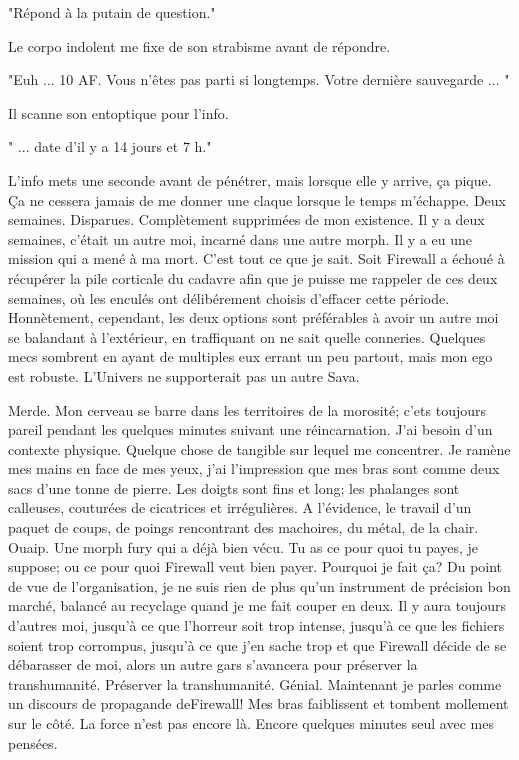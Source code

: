 "Répond à la putain de question." 

Le corpo indolent me fixe de son strabisme avant de répondre. 

"Euh ... 10 AF. Vous n'êtes pas parti si longtemps. Votre dernière sauvegarde ... " 

Il scanne son entoptique pour l'info. 

" ... date d'il y a 14 jours et 7 h." 

L'info mets une seconde avant de pénétrer, mais lorsque elle y arrive, ça pique. Ça ne cessera jamais de me donner une claque lorsque le temps m'échappe. Deux semaines. Disparues. Complètement supprimées de mon existence. Il y a deux semaines, c'était un autre moi, incarné dans une autre morph. Il y a eu une mission qui a mené à ma mort. C'est tout ce que je sait. Soit Firewall a échoué à récupérer la pile corticale du cadavre afin que je puisse me rappeler de ces deux semaines, où les enculés ont délibérement choisis d'effacer cette période. Honnètement, cependant, les deux options sont préférables à avoir un autre moi se balandant à l'extérieur, en traffiquant on ne sait quelle conneries. Quelques mecs sombrent en ayant de multiples eux errant un peu partout, mais mon ego est robuste. L'Univers ne supporterait pas un autre Sava. 

Merde. Mon cerveau se barre dans les territoires de la morosité; c'ets toujours pareil pendant les quelques minutes suivant une réincarnation. J'ai besoin d'un contexte physique. Quelque chose de tangible sur lequel me concentrer. Je ramène mes mains en face de mes yeux, j'ai l'impression que mes bras sont comme deux sacs d'une tonne de pierre. Les doigts sont fins et long; les phalanges sont calleuses, couturées de cicatrices et irrégulières. A l'évidence, le travail d'un paquet de coups, de poings rencontrant des machoires, du métal, de la chair. Ouaip. Une morph fury qui a déjà bien vécu. Tu as ce pour quoi tu payes, je suppose; ou ce pour quoi Firewall veut bien payer. Pourquoi je fait ça? Du point de vue de l'organisation, je ne suis rien de plus qu'un instrument de précision bon marché, balancé au recyclage quand je me fait couper en deux. Il y aura toujours d'autres moi, jusqu'à ce que l'horreur soit trop intense, jusqu'à ce que les fichiers soient trop corrompus, jusqu'à ce que j'en sache trop et que Firewall décide de se débarasser de moi, alors un autre gars s'avancera pour préserver la transhumanité. Préserver la transhumanité. Génial. Maintenant je parles comme un discours de propagande deFirewall! Mes bras faiblissent et tombent mollement sur le côté. La force n'est pas encore là. Encore quelques minutes seul avec mes pensées. 

